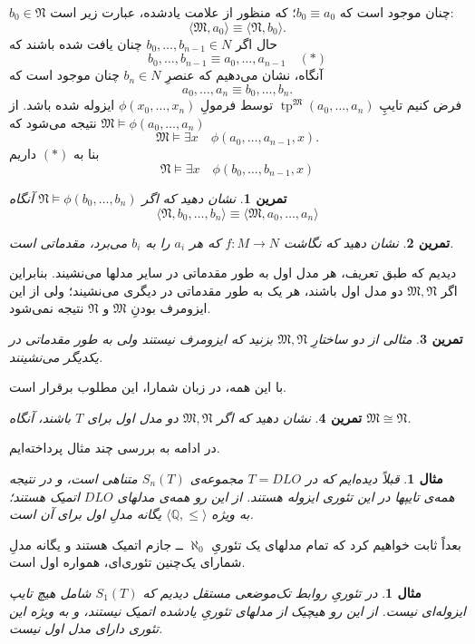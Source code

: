 \documentclass[12pt,a4paper]{report}
\theoremstyle{colorhead}
\newtheorem{tam}{تمرین}
\newtheorem{mesal}[thm]{مثال}
\DeclareMathOperator{\tp}{tp}
\begin{document}
$b_0\in \mathfrak{N}$
چنان موجود است که
$b_0\equiv a_0$؛
که منظور از علامت یادشده، عبارت زیر است:
\[
\langle \mathfrak{M},a_0\rangle\equiv \langle \mathfrak{N},b_0\rangle.
\]
حال اگر
$b_0,\ldots,b_{n-1}\in N$
چنان یافت شده باشند که
\[b_0,\ldots,b_{n-1}\equiv a_0,\ldots,a_{n-1}\quad (*)\] 
آنگاه، نشان می‌دهیم که عنصرِ
$b_n\in N$
چنان موجود است که
\[
a_0,\ldots,a_n\equiv b_0,\ldots,b_n.
\]
فرض کنیم تایپِ
$\tp^\mathfrak{M}(a_0,\ldots,a_n)$
توسط
فرمولِ
$\phi(x_0,\ldots,x_n)$
ایزوله شده باشد. از
\mbox{$\mathfrak{M}\models \phi(a_0,\ldots,a_n)$}
نتیجه می‌شود که
\[
\mathfrak{M}\models \exists x\quad \phi(a_0,\ldots,a_{n-1},x).\]
بنا به 
$(*)$
داریم
\[
\mathfrak{N}\models \exists x\quad \phi(b_0,\ldots,b_{n-1},x)\]
\begin{tam}
نشان دهید که اگر
$\mathfrak{N}\models \phi(b_0,\ldots,b_n)$
آنگاه 
\[
\langle \mathfrak{N}, b_0,\ldots,b_n\rangle\equiv \langle \mathfrak{M},a_0,\ldots,a_n\rangle\]
\end{tam}
\begin{tam}
نشان دهید که نگاشت
$f:M\to N$
که هر
$a_i$
را به
$b_i$
می‌برد، مقدماتی است. 
\end{tam}
دیدیم که طبق تعریف، هر مدل اول به طور مقدماتی در سایر مدلها می‌نشیند. بنابراین اگر
$\mathfrak{M},\mathfrak{N}$
دو مدل اول باشند، هر یک به طور مقدماتی در دیگری می‌نشیند؛ ولی از این ایزومرف بودنِ
$\mathfrak{M}$
و
$\mathfrak{N}$
نتیجه نمی‌شود.
\begin{tam}
مثالی از دو ساختارِ
$\mathfrak{
M},\mathfrak{N}$
بزنید که ایزومرف نیستند ولی به طور مقدماتی در یکدیگر می‌نشینند.
\end{tam}
با این همه، در زبان شمارا، این مطلوب برقرار است.
\begin{tam}
نشان دهید که اگر
$\mathfrak{M},\mathfrak{N}$
دو مدل اول برای
$T$
باشند، آنگاه
$\mathfrak{M}\cong \mathfrak{N}$.
\end{tam}
در ادامه به بررسی چند مثال پرداخته‌ایم. 
\begin{mesal}
قبلاً دیده‌ایم که در
$T=DLO$
مجموعه‌ی
$S_n(T)$
متناهی است، و در نتیجه همه‌ی تایپها در این تئوری ایزوله هستند. از این رو همه‌ی مدلهای
$DLO$
اتمیک هستند؛ به ویژه
$\langle\mathbb{Q},\leq\rangle$
یگانه مدلِ اول برای آن است. 
\end{mesal}
بعداً ثابت خواهیم کرد که تمام مدلهای یک تئوریِ
 $\aleph_0$ 
 ــ
جازم اتمیک هستند و یگانه مدلِ شمارای یک‌چنین تئوری‌ای، همواره اول است.
\begin{mesal}
در تئوریِ
روابط تک‌موضعی مستقل دیدیم که
$S_1(T)$
شامل هیچ تایپ ایزوله‌ای نیست. از این رو هیچیک از مدلهای تئوریِ یادشده اتمیک نیستند، و به ویژه این تئوری دارای مدل اول نیست.
\end{mesal}
\end{document}
